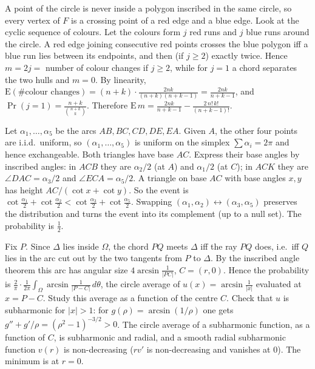 \documentclass[11pt,a4paper]{article}
\begin{document}
 A point of the circle is never inside a polygon inscribed in the same circle, so every vertex of $F$ is a crossing point of a red edge and a blue edge. Look at the cyclic sequence of colours.
 Let the colours form $j$ red runs and $j$ blue runs around the circle. A red edge joining consecutive red points crosses the blue polygon iff a blue run lies between its endpoints, and then (if $j\ge2$) exactly twice. Hence $m=2j=$ number of colour changes if $j\ge2$, while for $j=1$ a chord separates the two hulls and $m=0$.
 By linearity, $\mathrm E(\#\text{colour changes})=(n+k)\cdot\frac{2nk}{(n+k)(n+k-1)}=\frac{2nk}{n+k-1}$, and $\Pr(j=1)=\frac{n+k}{\binom{n+k}k}$. Therefore $\mathrm E\,m=\frac{2nk}{n+k-1}-\frac{2\,n!\,k!}{(n+k-1)!}$.

 Let $\alpha_1,\dots,\alpha_5$ be the arcs $AB,BC,CD,DE,EA$. Given $A$, the other four points are i.i.d.\ uniform, so $(\alpha_1,\dots,\alpha_5)$ is uniform on the simplex $\sum\alpha_i=2\pi$ and hence exchangeable.
 Both triangles have base $AC$. Express their base angles by inscribed angles: in $ACB$ they are $\alpha_2/2$ (at $A$) and $\alpha_1/2$ (at $C$); in $ACK$ they are $\angle DAC=\alpha_3/2$ and $\angle ECA=\alpha_5/2$. A triangle on base $AC$ with base angles $x,y$ has height $AC/(\cot x+\cot y)$.
 So the event is $\cot\frac{\alpha_1}2+\cot\frac{\alpha_2}2<\cot\frac{\alpha_3}2+\cot\frac{\alpha_5}2$. Swapping $(\alpha_1,\alpha_2)\leftrightarrow(\alpha_3,\alpha_5)$ preserves the distribution and turns the event into its complement (up to a null set). The probability is $\frac12$.

 Fix $P$. Since $\Delta$ lies inside $\Omega$, the chord $PQ$ meets $\Delta$ iff the ray $PQ$ does, i.e.\ iff $Q$ lies in the arc cut out by the two tangents from $P$ to $\Delta$. By the inscribed angle theorem this arc has angular size $4\arcsin\frac1{|PC|}$, $C=(r,0)$.
 Hence the probability is $\frac2\pi\cdot\frac1{2\pi}\int_\Omega\arcsin\frac1{|P-C|}\,d\theta$, the circle average of $u(x)=\arcsin\frac1{|x|}$ evaluated at $x=P-C$. Study this average as a function of the centre $C$.
 Check that $u$ is subharmonic for $|x|>1$: for $g(\rho)=\arcsin(1/\rho)$ one gets $g''+g'/\rho=(\rho^2-1)^{-3/2}>0$. The circle average of a subharmonic function, as a function of $C$, is subharmonic and radial, and a smooth radial subharmonic function $v(r)$ is non-decreasing ($rv'$ is non-decreasing and vanishes at $0$). The minimum is at $r=0$.
\end{document}
